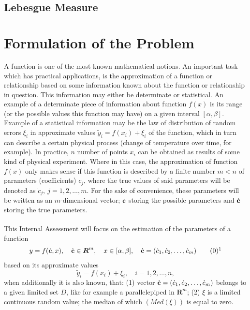 \subsection{Lebesgue Measure}

\section{Formulation of the Problem}

A function is one of the most known mathematical notions. An important task which has practical applications, is the approximation of a function or relationship based on some information known about the function or relationship in question. This information may either be determinate or statistical. An example of a determinate piece of information about function $f(x)$ is its range (or the possible values this function may have) on a given interval $[\alpha,\beta]$. Example of a statistical information may be the law of distribution of random errors $\xi_{i}$ in approximate values $\tilde{y}_{i} = f(x_{i})+\xi_{i}$ of the function, which in turn can describe a certain physical process (change of temperature over time, for example). In practice,  $n$ number of points $x_{i}$ can be obtained as results of some kind of physical experiment. Where in this case, the approximation of function $f(x)$ only makes sense if this function is described by a finite number $m<n$ of parameters (coefficients) $c_{j}$, where the true values of said parameters will be denoted as $\dot{c}_{j}, \ j=1,2,\dots,m.$ For the sake of convenience, these parameters will be written as an $m$-dimensional vector; $\textbf{c}$ storing the possible parameters and $\dot{\textbf{c}}$ storing the true parameters. \\
\\
This Internal Assessment will focus on the estimation of the parameters of a function 
\begin{equation} 
y = f(\dot{\textbf{c}},x),\quad \dot{\textbf{c}} \in \boldsymbol{R}^{m},\quad x \in [\alpha,\beta],\quad \dot{\textbf{c}} = (\dot{c}_{1}, \dot{c}_{2},\dots,\dot{c}_{m}) \label{301} \tag*{(\theequation)\protect\footnotemark}
\end{equation}
based on its approximate values
\begin{equation}
\tilde{y}_{i} = f(x_{i})+\xi_{i}, \quad i=1,2,\dots,n ,
\end{equation}
when additionally it is also known, that: (1) vector $\dot{\textbf{c}} = (\dot{c}_{1}, \dot{c}_{2},\dots,\dot{c}_{m})$ belongs to a given limited set $D$, like for example a parallelepiped in $\boldsymbol{R}^{m}$; (2) $\xi$ is a limited continuous random value; the median of which $(Med(\xi))$ is equal to zero. \\
